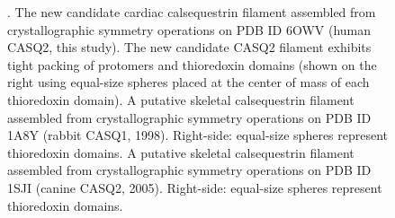 \begin{figure}[!h]
\begin{conditionalcaption}
\caption[Comparison of the new filament candidate to prior structures]{\textbf{\headingsubsectionthree}. \figurepanelcaptiona The new candidate cardiac calsequestrin filament assembled from crystallographic symmetry operations on PDB ID 6OWV (human CASQ2, this study). The new candidate CASQ2 filament exhibits tight packing of protomers and thioredoxin domains (shown on the right using equal-size spheres placed at the center of mass of each thioredoxin domain). \figurepanelcaptionb A putative skeletal calsequestrin filament assembled from crystallographic symmetry operations on PDB ID 1A8Y (rabbit CASQ1, 1998). Right-side: equal-size spheres represent thioredoxin domains. \figurepanelcaptionc A putative skeletal calsequestrin filament assembled from crystallographic symmetry operations on PDB ID 1SJI (canine CASQ2, 2005). Right-side: equal-size spheres represent thioredoxin domains.}
\label{fig:filament_comparison}
\end{conditionalcaption}
\end{figure}